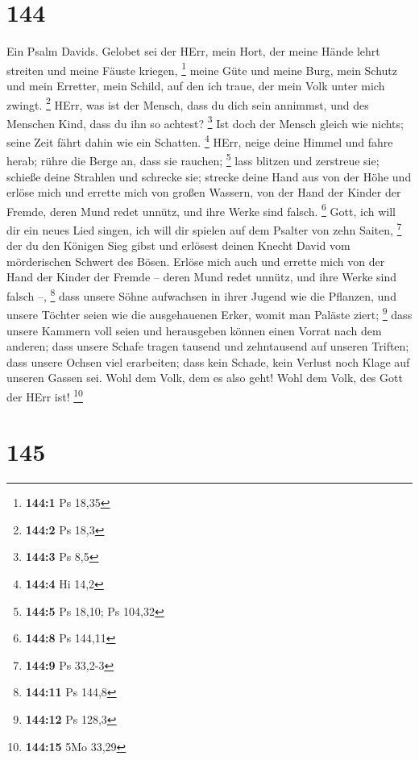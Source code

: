 \hypertarget{section-44}{%
\section{144}\label{section-44}}

 Ein Psalm Davids. Gelobet sei der HErr, mein Hort, der
meine Hände lehrt streiten und meine Fäuste kriegen, \footnote{\textbf{144:1}
  Ps 18,35}  meine Güte und meine Burg, mein Schutz und mein
Erretter, mein Schild, auf den ich traue, der mein Volk unter mich
zwingt. \footnote{\textbf{144:2} Ps 18,3}  HErr, was ist der
Mensch, dass du dich sein annimmst, und des Menschen Kind, dass du ihn
so achtest? \footnote{\textbf{144:3} Ps 8,5}  Ist doch der
Mensch gleich wie nichts; seine Zeit fährt dahin wie ein Schatten.
\footnote{\textbf{144:4} Hi 14,2}  HErr, neige deine Himmel
und fahre herab; rühre die Berge an, dass sie rauchen; \footnote{\textbf{144:5}
  Ps 18,10; Ps 104,32}  lass blitzen und zerstreue sie;
schieße deine Strahlen und schrecke sie;  strecke deine Hand
aus von der Höhe und erlöse mich und errette mich von großen Wassern,
von der Hand der Kinder der Fremde,  deren Mund redet
unnütz, und ihre Werke sind falsch. \footnote{\textbf{144:8} Ps 144,11}
 Gott, ich will dir ein neues Lied singen, ich will dir
spielen auf dem Psalter von zehn Saiten, \footnote{\textbf{144:9} Ps
  33,2-3}  der du den Königen Sieg gibst und erlösest
deinen Knecht David vom mörderischen Schwert des Bösen. 
Erlöse mich auch und errette mich von der Hand der Kinder der Fremde --
deren Mund redet unnütz, und ihre Werke sind falsch --, \footnote{\textbf{144:11}
  Ps 144,8}  dass unsere Söhne aufwachsen in ihrer Jugend
wie die Pflanzen, und unsere Töchter seien wie die ausgehauenen Erker,
womit man Paläste ziert; \footnote{\textbf{144:12} Ps 128,3}
 dass unsere Kammern voll seien und herausgeben können
einen Vorrat nach dem anderen; dass unsere Schafe tragen tausend und
zehntausend auf unseren Triften;  dass unsere Ochsen viel
erarbeiten; dass kein Schade, kein Verlust noch Klage auf unseren Gassen
sei.  Wohl dem Volk, dem es also geht! Wohl dem Volk, des
Gott der HErr ist! \footnote{\textbf{144:15} 5Mo 33,29}

\hypertarget{section-45}{%
\section{145}\label{section-45}}

